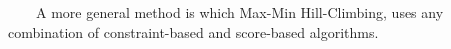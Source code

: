 ~~~~A more general method is which Max-Min Hill-Climbing, uses any combination of constraint-based and score-based algorithms.